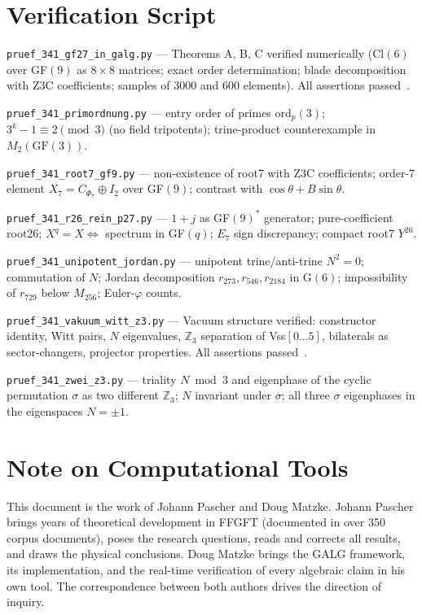 \section*{Verification Script}

\texttt{pruef\_341\_gf27\_in\_galg.py} --- Theorems A, B, C verified numerically
(Cl$(6)$ over GF$(9)$ as $8\times8$ matrices; exact order determination;
blade decomposition with Z3C coefficients; samples of 3000 and 600 elements).
All assertions passed~\BM.

\texttt{pruef\_341\_primordnung.py} --- entry order of primes $\mathrm{ord}_p(3)$;
$3^k-1\equiv2\pmod 3$ (no field tripotents); trine-product counterexample in $M_2(\text{GF}(3))$.

\texttt{pruef\_341\_root7\_gf9.py} --- non-existence of root7 with Z3C coefficients;
order-7 element $X_7=C_{\Phi_7}\oplus I_2$ over GF$(9)$; contrast with $\cos\theta+B\sin\theta$.

\texttt{pruef\_341\_r26\_rein\_p27.py} --- $1+j$ as GF$(9)^*$ generator; pure-coefficient
root26; $X^q=X\Leftrightarrow$ spectrum in GF$(q)$; $E_7$ sign discrepancy; compact root7 $Y^{26}$.

\texttt{pruef\_341\_unipotent\_jordan.py} --- unipotent trine/anti-trine $N^2=0$;
commutation of $N$; Jordan decomposition $r_{273},r_{546},r_{2184}$ in G$(6)$;
impossibility of $r_{729}$ below $M_{256}$; Euler-$\varphi$ counts.

\texttt{pruef\_341\_vakuum\_witt\_z3.py} --- Vacuum structure verified:
constructor identity, Witt pairs, $N$ eigenvalues, $\mathbb{Z}_3$ separation
of Vss$[0\ldots5]$, bilaterals as sector-changers, projector properties.
All assertions passed~\BM.

\texttt{pruef\_341\_zwei\_z3.py} --- triality $N\bmod 3$ and eigenphase of the cyclic
permutation $\sigma$ as two different $\mathbb{Z}_3$; $N$ invariant under $\sigma$;
all three $\sigma$ eigenphases in the eigenspaces $N=\pm1$.

\section*{Note on Computational Tools}

This document is the work of Johann Pascher and Doug Matzke.
Johann Pascher brings years of theoretical development in FFGFT
(documented in over 350 corpus documents), poses the research questions,
reads and corrects all results, and draws the physical conclusions.
Doug Matzke brings the GALG framework, its implementation, and the
real-time verification of every algebraic claim in his own tool.
The correspondence between both authors drives the direction of inquiry.

